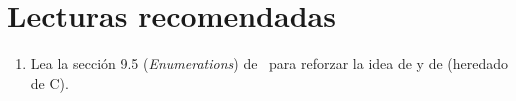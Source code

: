 \section{Lecturas recomendadas}

\begin{enumerate}

\item Lea la sección 9.5 (\emph{Enumerations}) de~\cite{stroustrup:2014}
      para reforzar la idea de  y de 
       (heredado de C).

\end{enumerate}
